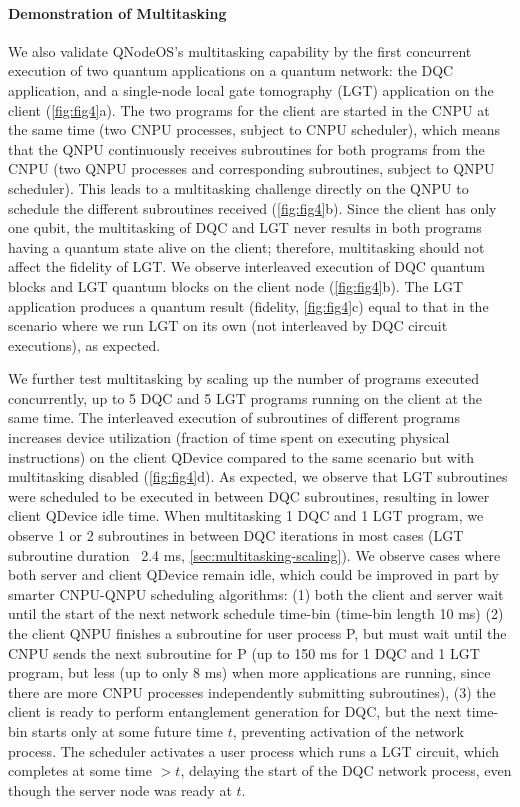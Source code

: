 \paragraph{Demonstration of Multitasking}
We also validate QNodeOS's multitasking capability by the first concurrent execution of two quantum applications on a quantum network: the DQC application, and a single-node local gate tomography (LGT) application on the client (\cref{fig:fig4}a). The two programs for the client are started in the CNPU at the same time (two CNPU processes, subject to CNPU scheduler), which means that the QNPU continuously receives subroutines for both programs from the CNPU (two QNPU processes and corresponding subroutines, subject to QNPU scheduler). This leads to a multitasking challenge directly on the QNPU to schedule the different subroutines received (\cref{fig:fig4}b). Since the client has only one qubit, the multitasking of DQC and LGT never results in both programs having a quantum state alive on the client; therefore, multitasking should not affect the fidelity of LGT. We observe interleaved execution of DQC quantum blocks and LGT quantum blocks on the client node (\cref{fig:fig4}b). The LGT application produces a quantum result (fidelity, \cref{fig:fig4}c) equal to that in the scenario where we run LGT on its own (not interleaved by DQC circuit executions), as expected.

We further test multitasking by scaling up the number of programs executed concurrently, up to 5 DQC and 5 LGT programs running on the client at the same time. The interleaved execution of subroutines of different programs increases device utilization (fraction of time spent on executing physical instructions) on the client QDevice compared to the same scenario but with multitasking disabled (\cref{fig:fig4}d). As expected, we observe that LGT subroutines were scheduled to be executed in between DQC subroutines, resulting in lower client QDevice idle time. When multitasking 1 DQC and 1 LGT program, we observe 1 or 2 subroutines in between DQC iterations in most cases (LGT subroutine duration ~2.4 ms, \cref{sec:multitasking-scaling}). We observe cases where both server and client QDevice remain idle, which could be improved in part by smarter CNPU-QNPU scheduling algorithms: (1) both the client and server wait until the start of the next network schedule time-bin (time-bin length 10 ms) (2) the client QNPU finishes a subroutine for user process P, but must wait until the CNPU sends the next subroutine for P (up to 150 ms for 1 DQC and 1 LGT program, but less (up to only 8 ms) when more applications are running, since there are more CNPU processes independently submitting subroutines), (3) the client is ready to perform entanglement generation for DQC, but the next time-bin starts only at some future time $t$, preventing activation of the network process. The scheduler activates a user process which runs a LGT circuit, which completes at some time $>t$, delaying the start of the DQC network process, even though the server node was ready at $t$.

